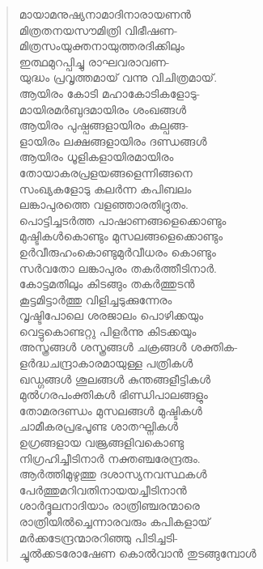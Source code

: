 \begin{verse}
മായാമനുഷ്യനാമാദിനാരായണന്‍\\
മിത്രതനയസൗമിത്രി വിഭീഷണ-\\
മിത്രസംയുക്തനായുത്തരദിക്കിലും\\
ഇത്ഥമുറപ്പിച്ചു രാഘവരാവണ-\\
യുദ്ധം പ്രവൃത്തമായ് വന്നു വിചിത്രമായ്.\\
ആയിരം കോടി മഹാകോടികളോടു-\\
മായിരമര്‍ബുദമായിരം ശംഖങ്ങള്‍\\
ആയിരം പുഷ്പങ്ങളായിരം കല്പങ്ങ-\\
ളായിരം ലക്ഷങ്ങളായിരം ദണ്ഡങ്ങള്‍\\
ആയിരം ധൂളികളായിരമായിരം\\
തോയാകരപ്രളയങ്ങളെന്നിങ്ങനെ\\
സംഖ്യകളോടു കലര്‍ന്ന കപിബലം\\
ലങ്കാപുരത്തെ വളഞ്ഞാരതിദ്രുതം.\\
പൊട്ടിച്ചടര്‍ത്ത പാഷാണങ്ങളെക്കൊണ്ടും\\
മുഷ്ടികള്‍കൊണ്ടും മുസലങ്ങളെക്കൊണ്ടും\\
ഉര്‍വീരുഹംകൊണ്ടുമുര്‍വീധരം കൊണ്ടും\\
സര്‍വതോ ലങ്കാപുരം തകര്‍ത്തീടിനാര്‍.\\
കോട്ടമതിലും കിടങ്ങും തകര്‍ത്തുടന്‍\\
കൂട്ടമിട്ടാര്‍ത്തു വിളിച്ചടുക്കുന്നേരം\\
വൃഷ്ടിപോലെ ശരജാലം പൊഴിക്കയും\\
വെട്ടുകൊണ്ടറ്റു പിളര്‍ന്നു കിടക്കയും\\
അസ്ത്രങ്ങള്‍ ശസ്ത്രങ്ങള്‍ ചക്രങ്ങള്‍ ശക്തിക-\\
ളര്‍ദ്ധചന്ദ്രാകാരമായുള്ള പത്രികള്‍\\
ഖഡ്ഗങ്ങള്‍ ശൂലങ്ങള്‍ കുന്തങ്ങളീട്ടികള്‍\\
മുല്‍ഗരപംക്തികള്‍ ഭിണ്ഡിപാലങ്ങളും\\
തോമരദണ്ഡം മുസലങ്ങള്‍ മുഷ്ടികള്‍\\
ചാമീകരപ്രഭപൂണ്ട ശാതഘ്നികള്‍\\
ഉഗ്രങ്ങളായ വജ്രങ്ങളിവകൊണ്ടു\\
നിഗ്രഹിച്ചീടിനാര്‍ നക്തഞ്ചരേന്ദ്രരും.\\
ആര്‍ത്തിമുഴുത്തു ദശാസ്യനവസ്ഥകള്‍\\
പേര്‍ത്തുമറിവതിനായയച്ചീടിനാന്‍\\
ശാര്‍ദ്ദൂലനാദിയാം രാത്രിഞ്ചരന്മാരെ\\
രാത്രിയില്‍ച്ചെന്നാരവരും കപികളായ്\\
മര്‍ക്കടേന്ദ്രന്മാരറിഞ്ഞു പിടിച്ചടി-\\
ച്ചുല്‍ക്കടരോഷേണ കൊല്‍വാന്‍ തുടങ്ങുമ്പോള്‍\\

\end{verse}
